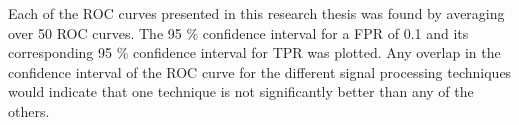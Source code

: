 Each of the ROC curves presented in this research thesis was found
by averaging over 50 ROC curves. The 95 \% confidence interval for a
FPR of 0.1 and its corresponding 95 \% confidence interval for TPR
was plotted. Any overlap in the confidence interval of the ROC curve
for the different signal processing techniques would indicate that
one technique is not significantly better than any of the others.
